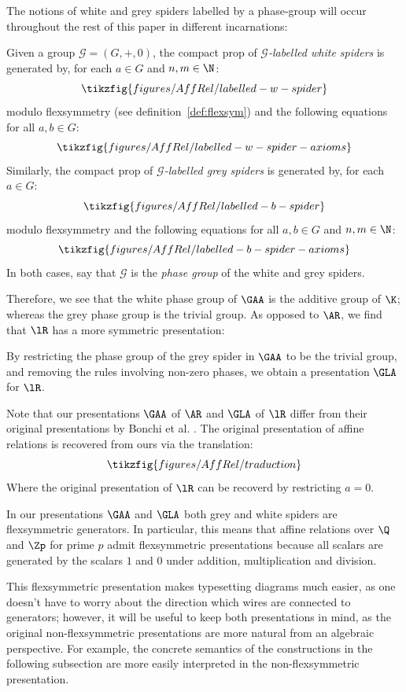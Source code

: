 The notions of white and grey spiders labelled by a phase-group will occur throughout the rest of this paper in different incarnations:
\begin{definition}
\label{def:phasegroup}
  Given a group \(\mathcal{G}=(G,+,0)\), the compact prop of {\em \(\mathcal{G}\)-labelled white spiders} is generated by, for each \(a \in G\) and \(n,m \in \N \):
  \[\tikzfig{figures/AffRel/labelled-w-spider}\]
  modulo flexsymmetry (see definition~\ref{def:flexsym}) and the following equations for all \(a,b\in G \):
  \[\tikzfig{figures/AffRel/labelled-w-spider-axioms}\]
  Similarly, the compact prop of {\em \(\mathcal{G}\)-labelled grey spiders} is generated by, for each \(a \in G\):
  \[\tikzfig{figures/AffRel/labelled-b-spider}\]
  modulo flexsymmetry and the following equations for all \(a,b\in G \) and \(n,m \in \N \):
  \[\tikzfig{figures/AffRel/labelled-b-spider-axioms}\]
  In both cases, say that \(\mathcal{G}\) is the {\em phase group} of the white and grey spiders.
\end{definition}
Therefore, we see that the white phase group of \(\GAA\) is the additive group of \(\K\); whereas the grey phase group is the trivial group.  As opposed to \(\AR\), we find that \(\lR\) has a more symmetric presentation:
\begin{corollary}
  By restricting the phase group of the  grey spider in \(\GAA\) to be the trivial group, and removing the rules involving non-zero phases, we obtain a presentation \(\GLA\) for \(\lR\).
\end{corollary}
Note that our presentations  \(\GAA\) of \(\AR\) and \(\GLA\) of \(\lR\) differ from their original presentations by Bonchi et al. \cite{gla,gaa}. The original presentation of affine relations is recovered from ours via the translation:
\[ \tikzfig{figures/AffRel/traduction} \]
Where the original presentation of  \(\lR\) can be recoverd by restricting \(a=0\).
\begin{remark}
\label{rem:notflexsym}
In our presentations \(\GAA\) and \(\GLA\) both grey and white spiders are flexsymmetric generators. In particular, this means that affine relations over \(\Q\) and \(\Zp\) for prime \(p\) admit flexsymmetric presentations because all scalars are generated by the scalars \(1\) and \(0\) under addition, multiplication and division.
\end{remark}
This flexsymmetric presentation makes typesetting diagrams much easier, as one doesn't have to worry about the direction which wires are connected to generators; however, it will be useful to keep both presentations in mind, as the original non-flexsymmetric presentations are more natural from an algebraic perspective. For example, the concrete semantics of the constructions in the following subsection are more easily interpreted in the non-flexsymmetric presentation.
